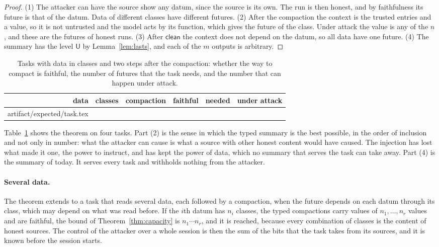 \documentclass[acmsmall,nonacm,screen]{acmart}
\makeatletter
\newcommand{\kw}[1]{\mathsf{#1}}
\newcommand{\U}{\kw{U}}
\newcommand{\op}[1]{\kw{#1}}
\newcommand{\claim}[2]{#2}
\newcommand{\rows}[1]{\@@input artifact/expected/#1.tex }
\makeatother
\begin{document}
\begin{proof}
(1) The attacker can have the source show any datum, since the source is its own. The run
is then honest, and by faithfulness its future is that of the datum. Data of different
classes have different futures. (2) After the compaction the context is the trusted entries
and a value, so it is not untrusted and the model acts by its function, which gives the
future of the class. Under attack the value is any of the $n$, and these are the futures of
honest runs. (3) After $\op{clean}$ the context does not depend on the datum, so all data
have one future. (4) The summary has the level $\U$ by Lemma~\ref{lem:lasts}, and each of
the $m$ outputs is arbitrary.
\end{proof}

\begin{table}
\caption{Tasks with data in classes and two steps after the compaction: whether the way to
compact is faithful, the number of futures that the task needs, and the number that can
happen under attack.}
\label{tab:task}
\begin{tabular}{rrlcrr}
\toprule
data & classes & compaction & faithful & needed & under attack \\
\midrule
\rows{task}
\bottomrule
\end{tabular}
\end{table}

\claim{task}{Table~\ref{tab:task} shows the theorem on four tasks.} Part (2) is the sense in
which the typed summary is the best possible, in the order of inclusion and not only in
number: what the attacker can cause is what a source with other honest content would have
caused. The injection has lost what made it one, the power to instruct, and has kept the
power of data, which no summary that serves the task can take away. Part (4) is the summary
of today. It serves every task and withholds nothing from the attacker.

\paragraph{Several data.} The theorem extends to a task that reads several data, each
followed by a compaction, when the future depends on each datum through its class, which may
depend on what was read before. If the $i$th datum has $n_i$ classes, the typed compactions
carry values of $n_1, \ldots, n_r$ values and are faithful, the bound of
Theorem~\ref{thm:capacity} is $n_1 \cdots n_r$, and it is reached, because every
combination of classes is the content of honest sources. The control of the attacker over a
whole session is then the sum of the bits that the task takes from its sources, and it is
known before the session starts.
\end{document}
